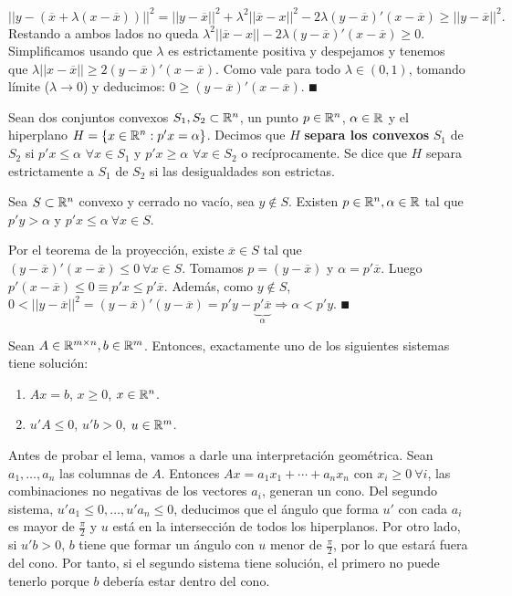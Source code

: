 \documentclass[PM.tex]{subfiles}
\begin{document}
\begin{dem}
\[
||y-(\overline{x}+\lambda(x-\overline{x}))||^2=||y-\overline{x}||^2+\lambda^2||\overline{x}-x||^2-2\lambda(y-\overline{x})'(x-\overline{x})\geq||y-\overline{x}||^2.
\]
Restando a ambos lados no queda $\lambda^2||\overline{x}-x||-2\lambda(y-\overline{x})'(x-\overline{x})\geq 0$. Simplificamos usando que $\lambda$ es estrictamente positiva y despejamos y tenemos que $\lambda||x-\overline{x}||\geq 2(y-\overline{x})'(x-\overline{x})$. Como vale para todo $\lambda\in (0,1)$, tomando límite ($\lambda\rightarrow 0$) y deducimos:  $0\geq (y-\overline{x})'(x-\overline{x})$. $\QED$
\end{dem}

\begin{defi} Sean dos conjuntos convexos $S_1,S_2\subset\mathbb{R}^n$, un punto $p\in\mathbb{R}^n$, $\alpha\in\mathbb{R}$ y el hiperplano $H=\{x\in\mathbb{R}^n: p'x=\alpha\}$. Decimos que $H$ \textbf{separa los convexos} $S_1$ de $S_2$ si $p'x\leq\alpha$ $\forall x\in S_1$ y $p'x\geq\alpha$ $\forall x\in S_2$ o recíprocamente. Se dice que $H$ separa estrictamente a $S_1$ de $S_2$ si las desigualdades son estrictas.
\end{defi}

\begin{lema}
Sea $S\subset\mathbb{R}^n$ convexo y cerrado no vacío, sea $y\not\in S$. Existen $p\in\mathbb{R}^n, \alpha\in\mathbb{R}$ tal que $p'y>\alpha$ y $p'x\leq\alpha\ \forall x\in S$.
\end{lema}
\begin{dem}
Por el teorema de la proyección, existe $\overline{x}\in S$ tal que $(y-\overline{x})'(x-\overline{x})\leq 0\ \forall x\in S$. Tomamos $p=(y-\overline{x})$ y $\alpha=p' \overline{x}$. Luego $p'(x-\overline{x})\leq 0\equiv p'x\leq p'\overline{x}$. Además, como $y\not\in S$, $0<||y-\overline{x}||^2=(y-\overline{x})'(y-\overline{x})=p'y-\underbrace{p'\overline{x}}_\alpha \Rightarrow \alpha <p'y$. $\QED$
\end{dem}

\newpage

\begin{lema}[de Farkas]
Sean $A\in \mathbb{R}^{m\times n}, b\in\mathbb{R}^m$. Entonces, exactamente uno de los siguientes sistemas tiene solución:
\begin{enumerate}
\item $Ax=b$, $x\geq 0$, $x\in\mathbb{R}^n$.
\item $u'A\leq 0$, $u'b>0$, $u\in \mathbb{R}^m$.
\end{enumerate}
\end{lema}

Antes de probar el lema, vamos a darle una interpretación geométrica. Sean $a_1,\dots, a_n$ las columnas de $A$. Entonces $Ax=a_1x_1+\cdots +a_nx_n$ con $x_i\geq 0\ \forall i$, las combinaciones no negativas de los vectores $a_i$, generan un cono. Del segundo sistema, $u'a_1\leq 0,\dots , u'a_n\leq 0$, deducimos que el ángulo que forma $u'$ con cada $a_i$ es mayor de $\frac{\pi}{2}$ y $u$ está en la intersección de todos los hiperplanos. Por otro lado, si $u'b>0$, $b$ tiene que formar un ángulo con $u$ menor de $\frac{\pi}{2}$, por lo que estará fuera del cono. Por tanto, si el segundo sistema tiene solución, el primero no puede tenerlo porque $b$ debería estar dentro del cono. 
\end{document}
